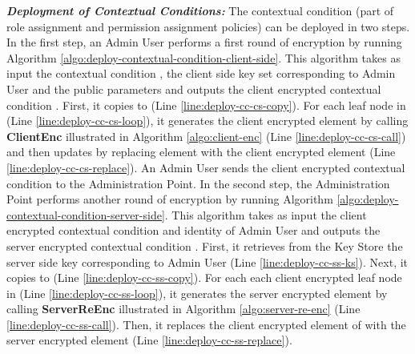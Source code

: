 \documentclass[final,5p,times,twocolumn]{elsarticle}
\begin{document}
\emph{\textbf{Deployment of Contextual Conditions:}}
The contextual condition (part of role assignment and permission assignment policies) can be deployed in two steps. In the first step, an Admin User performs a first round of encryption by running Algorithm \ref{algo:deploy-contextual-condition-client-side}. This algorithm takes as input the contextual condition , the client side key set  corresponding to Admin User  and the public parameters  and outputs the client encrypted contextual condition . First, it copies  to  (Line \ref{line:deploy-cc-cs-copy}). For each leaf node in  (Line \ref{line:deploy-cc-cs-loop}), it generates the client encrypted element by calling \textbf{ClientEnc} illustrated in Algorithm \ref{algo:client-enc} (Line \ref{line:deploy-cc-cs-call}) and then updates  by replacing element  with the client encrypted element  (Line \ref{line:deploy-cc-cs-replace}). An Admin User sends the client encrypted contextual condition to the Administration Point.
In the second step, the Administration Point performs another round of encryption by running Algorithm \ref{algo:deploy-contextual-condition-server-side}. This algorithm takes as input the client encrypted contextual condition  and identity of Admin User  and outputs the server encrypted contextual condition . First, it retrieves from the Key Store the server side key  corresponding to Admin User  (Line \ref{line:deploy-cc-ss-ks}). Next, it copies  to  (Line \ref{line:deploy-cc-ss-copy}). For each each client encrypted leaf node in  (Line \ref{line:deploy-cc-ss-loop}), it generates the server encrypted element by calling \textbf{ServerReEnc} illustrated in Algorithm \ref{algo:server-re-enc} (Line \ref{line:deploy-cc-ss-call}). Then, it replaces the client encrypted element  of  with the server encrypted element  (Line \ref{line:deploy-cc-ss-replace}).
\end{document}
